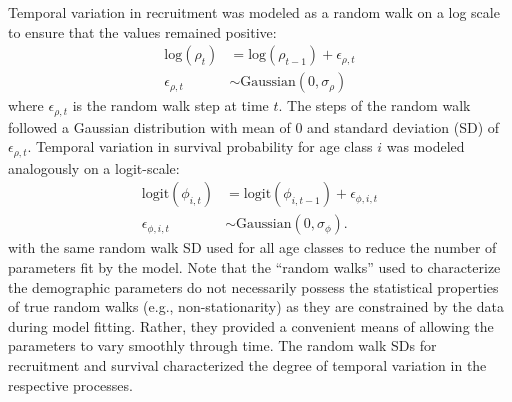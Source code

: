 \documentclass[11pt]{article}
\begin{document}
Temporal variation in recruitment was modeled as a random walk on a log scale to ensure
that the values remained positive:
%
\begin{equation} \label{eq:rho}
\begin{aligned}
\text{log}\left(\rho_t\right) &= \text{log}\left(\rho_{t - 1}\right) + \epsilon_{\rho,t} \\
\epsilon_{\rho,t} &\sim \text{Gaussian}\left(0, \sigma_{\rho} \right)
\end{aligned}
\end{equation}
%
where $\epsilon_{\rho,t}$ is the random walk step at time $t$.
The steps of the random walk followed a Gaussian distribution with mean of 0 
and standard deviation (SD) of $\epsilon_{\rho,t}$.
Temporal variation in survival probability for age class $i$ was modeled analogously 
on a logit-scale:
%
\begin{equation} \label{eq:phi}
\begin{aligned}
\text{logit}\left(\phi_{i, t}\right) &= \text{logit}\left(\phi_{i, t - 1}\right) +
                                          \epsilon_{\phi,i,t} \\
\epsilon_{\phi,i,t} &\sim \text{Gaussian}\left(0, \sigma_{\phi} \right)\text{.}
\end{aligned}
\end{equation}
%
with the same random walk SD used for all age classes 
to reduce the number of parameters fit by the model.
Note that the ``random walks'' used to characterize the demographic parameters 
do not necessarily possess the statistical properties 
of true random walks (e.g., non-stationarity) 
as they are constrained by the data during model fitting.
Rather, they provided a convenient means 
of allowing the parameters to vary smoothly through time.
The random walk SDs for recruitment and survival 
characterized the degree of temporal variation in the respective processes. 
\end{document}
